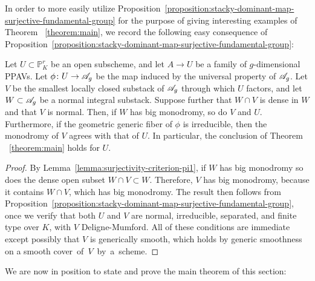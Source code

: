 In order to more easily utilize Proposition~\ref{proposition:stacky-dominant-map-surjective-fundamental-group} for the purpose of giving interesting examples of Theorem ~\ref{theorem:main}, we record the following easy consequence of Proposition~\ref{proposition:stacky-dominant-map-surjective-fundamental-group}:
\vspace*{-0.2cm}
\begin{corollary} \label{corollary:criterion-for-applying-main}
       Let $U \subset \mathbb P^r_K$ be an open subscheme, and let $A \rightarrow U$ be a family of $g$-dimensional PPAVs. Let $\phi \colon U \rightarrow {\mathscr A_g}$ be the map induced by the universal property of ${\mathscr A_g}$.
Let $V$ be the smallest locally closed substack of ${\mathscr A_g}$ through which $U$ factors, and let $W \subset {\mathscr A_g}$ be a normal integral substack.
Suppose further that $W \cap V$ is dense in $W$ and that $V$ is normal.
Then, if $W$ has big monodromy, so do $V$ and $U$.
Furthermore, if the geometric generic fiber of $\phi$ is irreducible, then the monodromy of $V$ agrees with that of $U$. In particular, the conclusion of Theorem ~\ref{theorem:main}
holds for $U$.
\end{corollary}
\vspace*{-0.4cm}
\begin{proof}
	By Lemma~\ref{lemma:surjectivity-criterion-pi1}, if $W$ has big monodromy so does the dense open subset $W \cap V \subset W$.
	Therefore, $V$ has big monodromy, because it contains $W \cap V$, which has big monodromy.
	The result then follows from Proposition~\ref{proposition:stacky-dominant-map-surjective-fundamental-group},
once we verify that both $U$ and $V$ are normal, irreducible, separated, and finite type over $K$, with $V$ Deligne-Mumford.
All of these conditions are immediate except possibly that $V$
is generically smooth, which holds by generic smoothness on a smooth \mbox{cover of $V$ by a scheme.}
\end{proof}
\vspace*{-0.2cm}
We are now in position to state and prove the main theorem of this section:
\vspace*{-0.2cm}

